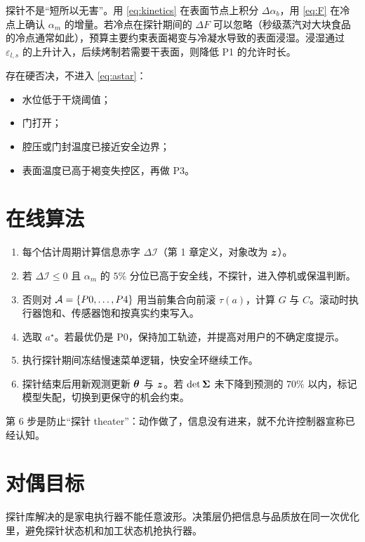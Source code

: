 探针不是“短所以无害”。用 \eqref{eq:kinetics} 在表面节点上积分 $\Delta\alpha_b$，用 \eqref{eq:F} 在冷点上确认 $\alpha_m$ 的增量。若冷点在探针期间的 $\Delta F$ 可以忽略（秒级蒸汽对大块食品的冷点通常如此），预算主要约束表面褐变与冷凝水导致的表面浸湿。浸湿通过 $\varepsilon_{l,s}$ 的上升计入，后续烤制若需要干表面，则降低 P1 的允许时长。

存在硬否决，不进入 \eqref{eq:astar}：

\begin{itemize}
\item 水位低于干烧阈值；
\item 门打开；
\item 腔压或门封温度已接近安全边界；
\item 表面温度已高于褐变失控区，再做 P3。
\end{itemize}

\section{在线算法}

\begin{enumerate}
\item 每个估计周期计算信息赤字 $\Delta\mathcal{I}$（第 1 章定义，对象改为 $\bm{z}$）。
\item 若 $\Delta\mathcal{I}\le 0$ 且 $\alpha_m$ 的 $5\%$ 分位已高于安全线，不探针，进入停机或保温判断。
\item 否则对 $\mathcal{A}=\{P0,\ldots,P4\}$ 用当前集合向前滚 $\tau(a)$，计算 $G$ 与 $C$。滚动时执行器饱和、传感器饱和按真实约束写入。
\item 选取 $a^\star$。若最优仍是 P0，保持加工轨迹，并提高对用户的不确定度提示。
\item 执行探针期间冻结慢速菜单逻辑，快安全环继续工作。
\item 探针结束后用新观测更新 $\bm{\theta}$ 与 $\bm{z}$。若 $\det\bm{\Sigma}$ 未下降到预测的 $70\%$ 以内，标记模型失配，切换到更保守的机会约束。
\end{enumerate}

第 6 步是防止“探针 theater”：动作做了，信息没有进来，就不允许控制器宣称已经认知。

\section{对偶目标}

探针库解决的是家电执行器不能任意波形。决策层仍把信息与品质放在同一次优化里，避免探针状态机和加工状态机抢执行器。

